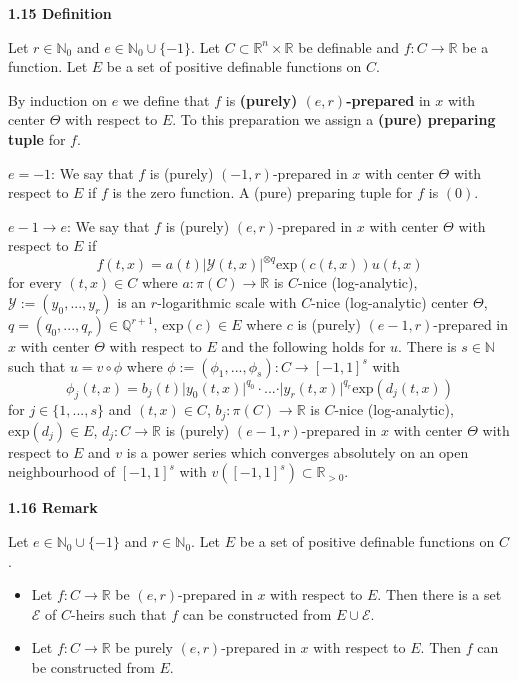 \documentclass[12pt]{article}
\def\vs{\vspace}
\def\exp{\mathrm{exp}}
\begin{document}
\vs{0.5cm}
{\bf1.15 Definition}

\vs{0.1cm}
Let $r \in \mathbb{N}_0$ and $e \in \mathbb{N}_0 \cup \{-1\}$. Let $C \subset \mathbb{R}^n \times \mathbb{R}$ be definable and $f:C \to \mathbb{R}$ be a function. Let $E$ be a set of positive definable functions on $C$.

\vs{0.1cm}
By induction on $e$ we define that $f$ is \textbf{(purely) $(e,r)$-prepared} in $x$ with center $\Theta$ with respect to $E$. To this preparation we assign a \textbf{(pure) preparing tuple} for $f$.

\vs{0.3cm}
$e=-1$: We say that $f$ is (purely) $(-1,r)$-prepared in $x$ with center $\Theta$ with respect to $E$ if $f$ is the zero function. A (pure) preparing tuple for $f$ is $(0)$.

\vs{0.3cm}
$e-1 \to e$: We say that $f$ is (purely) $(e,r)$-prepared in $x$ with center $\Theta$ with respect to $E$ if 
$$f(t,x)=a(t)\vert{\mathcal{Y}(t,x)}\vert^{\otimes q}\exp(c(t,x)) u(t,x)$$
for every $(t,x) \in C$ where $a:\pi(C) \to \mathbb{R}$ is $C$-nice (log-analytic), $\mathcal{Y}:=(y_0,...,y_r)$ is an $r$-logarithmic scale with $C$-nice (log-analytic) center $\Theta$, $q=(q_0,...,q_r) \in \mathbb{Q}^{r+1}$, $\exp(c) \in E$ where $c$ is (purely) $(e-1,r)$-prepared in $x$ with center $\Theta$ with respect to $E$ and the following holds for $u$. There is $s \in \mathbb{N}$ such that $u=v \circ \phi$ where $\phi:=(\phi_1,...,\phi_s):C \to [-1,1]^s$ with 
$$\phi_j(t,x)=b_j(t)\vert{y_0(t,x)}\vert^{q_0} \cdot ... \cdot \vert{y_r(t,x)}\vert^{q_r}\exp(d_j(t,x))$$
for $j \in \{1,...,s\}$ and $(t,x) \in C$, $b_j:\pi(C) \to \mathbb{R}$ is $C$-nice (log-analytic), $\exp(d_j) \in E$, $d_j:C \to \mathbb{R}$ is (purely) $(e-1,r)$-prepared in $x$ with center $\Theta$ with respect to $E$ and $v$ is a power series which converges absolutely on an open neighbourhood of $[-1,1]^s$ with $v([-1,1]^s) \subset \mathbb{R}_{>0}$.

\vs{0.5cm}
{\bf1.16 Remark}

\vs{0.1cm}
Let $e \in \mathbb{N}_0 \cup \{-1\}$ and $r \in \mathbb{N}_0$. Let $E$ be a set of positive definable functions on $C$. 
\begin{itemize}
	\item[(1)]
	Let $f:C \to \mathbb{R}$ be $(e,r)$-prepared in $x$ with respect to $E$. Then there is a set $\mathcal{E}$ of $C$-heirs such that $f$ can be constructed from $E \cup \mathcal{E}$.
	\item[(2)]
	Let $f:C \to \mathbb{R}$ be purely $(e,r)$-prepared in $x$ with respect to $E$. Then $f$ can be constructed from $E$.
\end{itemize}
\end{document}
